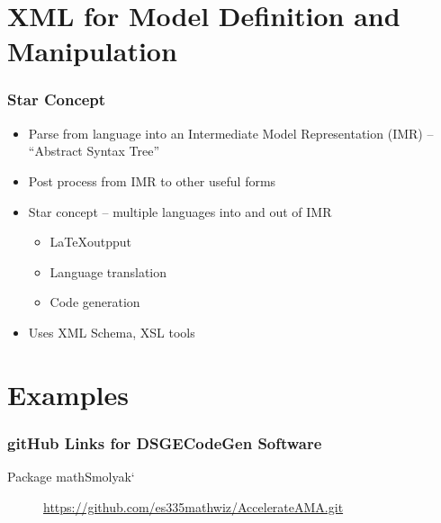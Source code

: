 \documentclass[handout]{beamer}
\begin{document}
\section{XML for  Model Definition and Manipulation}

\begin{frame}
  \frametitle{Star Concept}
  \begin{itemize}
 \item Parse from language into an Intermediate Model Representation (IMR)
 -- ``Abstract Syntax Tree'' 
  \item Post process from IMR to other useful forms
  \item Star concept --  multiple languages into and out of IMR
    \begin{itemize}
    \item \LaTeX outpput
    \item Language translation
    \item Code generation
    \end{itemize}

  \item Uses XML Schema, XSL tools
  \end{itemize}

\end{frame}
\section{Examples}


\begin{frame}
  \frametitle{gitHub Links for DSGECodeGen Software}
  

  \begin{description}
  \item[ \cite{Judd2013} Package mathSmolyak`] \href{https://github.com/es335mathwiz/AccelerateAMA.git}{https://github.com/es335mathwiz/AccelerateAMA.git}
\end{description}

\end{frame}
\end{document}
